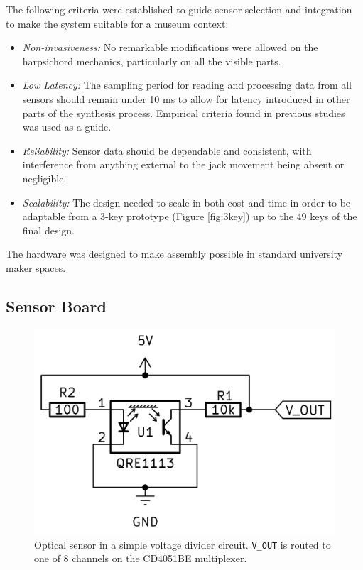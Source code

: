 The following criteria were established to guide sensor selection and integration to make the system suitable for a museum context:

\begin{itemize}
    \item \emph{Non-invasiveness:} No remarkable modifications were allowed on the harpsichord mechanics, particularly on all the visible parts.
    \item \emph{Low Latency:} The sampling period for reading and processing data from all sensors should remain under 10 ms to allow for latency introduced in other parts of the synthesis process. Empirical criteria found in previous studies \cite{Jack2016} was used as a guide.
    \item \emph{Reliability:} Sensor data should be dependable and consistent, with interference from anything external to the jack movement being absent or negligible.
    \item \emph{Scalability:} The design needed to scale in both cost and time in order to be adaptable from a 3-key prototype (Figure \ref{fig:3key}) up to the 49 keys of the final design.
\end{itemize}

The hardware was designed to make assembly possible in standard university maker spaces.  

\subsection{Sensor Board}\label{sensor-board}

\begin{figure}[!h] 
  \centering
  \includegraphics[width=0.7\linewidth,trim={0 0.5cm 0 0.5cm},clip]{src/images/simple-schematic-bw-.jpg} 
  \caption{Optical sensor in a simple voltage divider circuit. \texttt{V\_OUT} is routed to one of 8 channels on the CD4051BE multiplexer.}
  \Description{} 
  \label{fig:simple-schematic}
\end{figure}

